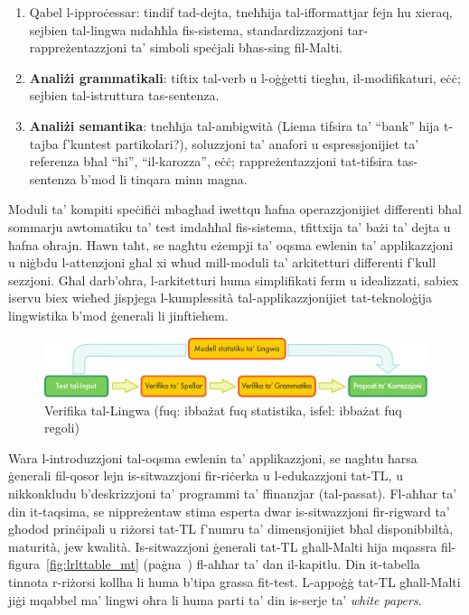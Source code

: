 \begin{multicols}{2}
\begin{enumerate}
\item Qabel l-ipproċessar: tindif tad-dejta, tneħħija tal-ifformattjar fejn hu xieraq, sejbien tal-lingwa mdaħħla fis-sistema, standardizzazjoni tar-rappreżentazzjoni ta’ simboli speċjali bħas-sing fil-Malti.
\item \textbf{Analiżi grammatikali}: tiftix tal-verb u l-oġġetti tiegħu, il-modifikaturi, eċċ;  sejbien tal-istruttura tas-sentenza.
\item \textbf{Analiżi semantika}: tneħħja tal-ambigwità (Liema tifsira ta’ “bank” hija t-tajba f’kuntest partikolari?), soluzzjoni ta’ anafori u espressjonijiet ta' referenza bħal “hi”, “il-karozza”, eċċ; rappreżentazzjoni tat-tifsira tas-sentenza b’mod li tinqara minn magna.
\end{enumerate}

Moduli ta’ kompiti speċifiċi mbagħad iwettqu ħafna operazzjonijiet differenti bħal sommarju awtomatiku ta’ test imdaħħal fis-sistema, tfittxija ta’ bażi ta' dejta u ħafna oħrajn. Hawn taħt, se nagħtu eżempji ta’ oqsma ewlenin ta’ applikazzjoni u niġbdu l-attenzjoni għal xi wħud mill-moduli ta’ arkitetturi differenti f'kull sezzjoni. Għal darb’oħra, l-arkitetturi huma simplifikati ferm u idealizzati, sabiex iservu biex wieħed jispjega l-kumplessità tal-applikazzjonijiet tat-teknoloġija lingwistika b'mod ġenerali li jinftiehem.

\begin{figure}[b]
  \center
  \includegraphics[width=\textwidth]{../_media/maltese/language_checking}
  \caption{Verifika tal-Lingwa (fuq: ibbażat fuq statistika, isfel: ibbażat fuq regoli)}
  \label{fig:langcheckingaarch_mt}
\end{figure}

Wara l-introduzzjoni tal-oqsma ewlenin ta’ applikazzjoni, se nagħtu ħarsa ġenerali fil-qosor lejn is-sitwazzjoni fir-riċerka u l-edukazzjoni tat-TL, u nikkonkludu b’deskrizzjoni ta’ programmi ta’ ffinanzjar (tal-passat). Fl-aħħar ta’ din it-taqsima, se nippreżentaw stima esperta dwar is-sitwazzjoni fir-rigward ta’ għodod prinċipali u riżorsi tat-TL f’numru ta’ dimensjonijiet bħal disponibbiltà, maturità, jew kwalità. Is-sitwazzjoni ġenerali tat-TL għall-Malti hija mqassra fil-figura~\ref{fig:lrlttable_mt} (paġna~\pageref{fig:lrlttable_mt}) fl-aħħar ta' dan il-kapitlu. Din it-tabella tinnota r-riżorsi kollha li huma b’tipa grassa fit-test. L-appoġġ tat-TL għall-Malti jiġi mqabbel ma' lingwi oħra li huma parti ta' din is-serje ta' \emph{white papers}.


\end{multicols}
